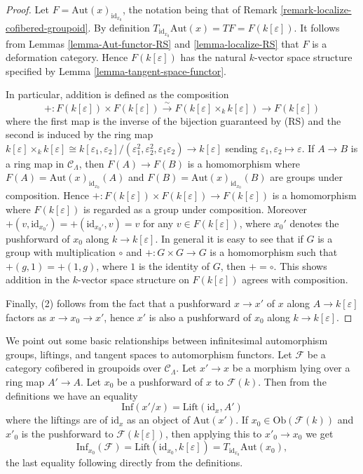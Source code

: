 \begin{proof}
Let $F = \text{Aut}(x)_{\text{id}_{x_0}}$, the notation being that 
of Remark \ref{remark-localize-cofibered-groupoid}. By definition 
$T_{\text{id}_{x_0}} \text{Aut}(x) = TF = F(k[\varepsilon])$. It 
follows from Lemmas \ref{lemma-Aut-functor-RS} and \ref{lemma-localize-RS} that 
$F$ is a deformation category.  Hence $F(k[\varepsilon])$ has the natural 
$k$-vector space structure specified by Lemma 
\ref{lemma-tangent-space-functor}.  

\medskip \noindent
In particular, addition is defined as the composition
\[ +: F(k[\varepsilon]) \times F(k[\varepsilon]) \xrightarrow{\sim} 
F(k[\varepsilon] \times_{k} k[\varepsilon]) \to F(k[\varepsilon]) \]
where the first map is the inverse of the bijection guaranteed by (RS) and the 
second is induced by the ring map $k[\varepsilon] \times_{k} k[\varepsilon] 
\cong k[\varepsilon_1,\varepsilon_2]/(\varepsilon_1^2, \varepsilon_2^2, 
\varepsilon_1\varepsilon_2) \to k[\varepsilon]$ sending 
$\varepsilon_1,\varepsilon_2 \mapsto \varepsilon$. If $A \to B$ is a 
ring map in $\mathcal{C}_\Lambda$, then $F(A) \to F(B)$ is a 
homomorphism where $F(A) = \text{Aut}(x)_{\text{id}_{x_0}}(A)$ and 
$F(B) = \text{Aut}(x)_{\text{id}_{x_0}}(B)$ are groups under 
composition.  Hence $+: F(k[\varepsilon]) \times F(k[\varepsilon])\to 
F(k[\varepsilon])$ is a homomorphism where $F(k[\varepsilon])$ is regarded as a 
group under composition.  Moreover $+(v, \text{id}_{x_0'}) = 
+(\text{id}_{x_0'},v) = v$ for any $v \in F(k[\varepsilon])$, where 
$x_0'$ denotes the pushforward of $x_0$ along $k \to k[\varepsilon]$.  
In general it is easy to see that if $G$ is a group with multiplication $\circ$ 
and $+: G \times G \to G$ is a homomorphism such that $+(g,1) = 
+(1,g)$, where $1$ is the identity of $G$, then $+ = \circ$.  This shows 
addition in the $k$-vector space structure on $F(k[\varepsilon])$ agrees with 
composition.

\medskip \noindent
Finally, (2) follows from the fact that a pushforward $x \to x'$ of $x$ 
along $A \to k[\varepsilon]$ factors as $x \to x_0 \to 
x'$, hence $x'$ is also a pushforward of $x_0$ along $k \to 
k[\varepsilon]$.
\end{proof}

\begin{remark}
\label{remark-infaut-lifting-equalities}
We point out some basic relationships between infinitesimal automorphism 
groups, liftings, and tangent spaces to automorphism functors.  Let $\mathcal 
F$ be a category cofibered in groupoids over $\mathcal{C}_\Lambda$.  Let $x' 
\to x$ be a morphism lying over a ring map $A' \to A$.  Let 
$x_0$ be a pushforward of $x$ to $\mathcal{F}(k)$.  Then from the definitions we 
have an equality
\[ \text{Inf}(x'/x) = \text{Lift}(\text{id}_{x}, A') \]
where the liftings are of $\text{id}_{x}$ as an object of 
$\text{Aut}(x')$.  If $x_0 \in \text{Ob}(\mathcal{F}(k))$ and $x'_0$ 
is the pushforward to $\mathcal{F}(k[\varepsilon])$, then applying this to $x'_0 
\to x_0$ we get 
\[ \text{Inf}_{x_0}(\mathcal{F}) = 
\text{Lift}(\text{id}_{x_0}, k[\varepsilon]) = 
T_{\text{id}_{x_0}} \text{Aut}(x_0), \]
the last equality following directly from the definitions.
\end{remark}


